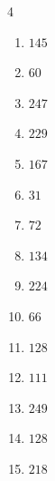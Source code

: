 \begin{multicols}{4}
\begin{enumerate}

  \item $145$


  \item $60$


  \item $247$


  \item $229$


  \item $167$


  \item $31$


\columnbreak %

\resetques

  \item $72$


  \item $134$


  \item $224$


  \item $66$


  \item $128$


  \item $111$


  \item $249$


  \item $128$


  \item $218$


\end{enumerate}
\end{multicols}
